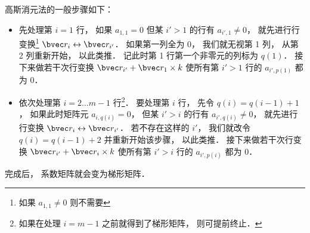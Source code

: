 高斯消元法的一般步骤如下：
\begin{itemize}
\item 先处理第 $i = 1$ 行， 如果 $a_{1,1} = 0$ 但某 $i' > 1$ 的行有 $a_{i', 1} \ne 0$， 就先进行行变换\footnote{如果 $a_{1,1} \ne 0$ 则不需要} $\bvec r_i \leftrightarrow \bvec r_{i'}$． 如果第一列全为 0， 我们就无视第  1 列， 从第 2 列重新开始， 以此类推． 记此时第 1 行第一个非零元的列标为 $q(1)$． 接下来做若干次行变换 $\bvec r_{i'} + \bvec r_1 \times k$ 使所有第 $i' > 1$ 行的 $a_{i', p(1)}$ 都为 0．

\item 依次处理第 $i = 2\dots m-1$ 行\footnote{如果在处理 $i = m-1$ 之前就得到了梯形矩阵， 则可提前终止．}． 要处理第 $i$ 行， 先令 $q(i) = q(i-1)+1$， 如果此时矩阵元 $a_{i, q(i)} = 0$， 但某 $i' > i$ 的行有 $a_{i', q(i)} \ne 0$， 就先进行行变换 $\bvec r_i \leftrightarrow \bvec r_{i'}$． 若不存在这样的 $i'$， 我们就改令 $q(i) = q(i-1) + 2$ 并重新开始该步骤， 以此类推． 接下来做若干次行变换 $\bvec r_{i'} + \bvec r_i \times k$ 使所有第 $i' > i$ 行的 $a_{i', p(i)}$ 都为 0．
\end{itemize}
完成后， 系数矩阵就会变为梯形矩阵．


